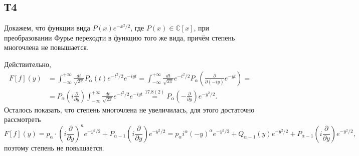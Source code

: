 \subsection{Т4}

Докажем, что функции вида $P(x) e^{-x^2/2}$, где $P(x) \in \mathbb{C}[x]$, при преобразовании Фурье переходти в функцию того же вида, причём степень многочлена не повышается. 

Действительно,
\begin{align*}
    F[f](y) 
    &= 
    \int_{-\infty}^{+\infty} \frac{d t}{\sqrt{2\pi}} P_\alpha (t) e^{-t^2/2} e^{-iyt} 
    = 
    \int_{-\infty}^{+\infty} \frac{d t}{\sqrt{2\pi}} e^{-t^2/2} P_\alpha \left(
        \frac{\partial }{\partial (-iy)}  e^{-yt}
    \right) 
    = \\ &= 
    P_\alpha \left(
        i \frac{\partial }{\partial y} 
    \right) \int_{-\infty}^{+\infty} \frac{d t}{\sqrt{2\pi}}
    e^{-t^2/2} e^{-iyt}
    \overset{17.8(2)}{=} 
    P_\alpha \left(
        - \frac{\partial }{\partial y} 
    \right) e^{-y^2/2}.
\end{align*}
Осталось показать, что степень многочлена не увеличилась, для этого достаточно рассмотреть
\begin{equation*}
    F[f](y) = p_\alpha \cdot \left(
        i \frac{\partial }{\partial y} 
    \right)^n e^{-y^2/2} + P_{\alpha-1} \left(
        i \frac{\partial }{\partial y} 
    \right) e^{-y^2/2}
    = 
    p_\alpha i^{\alpha} (-y)^\alpha e^{-y^2/2} + Q_{\alpha-1} (y) e^{-y^2/2} + P_{\alpha-1} \left(
        i \frac{\partial }{\partial y}
    \right)e^{-y^2/2},
\end{equation*}
поэтому степень не повышается.


